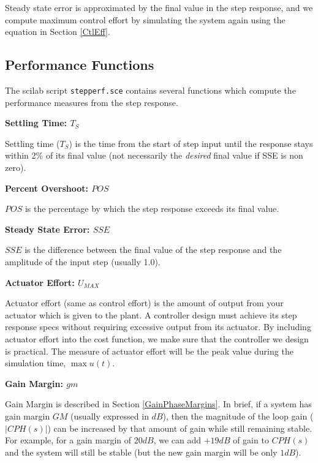 Steady state error is approximated by the final value in the step response, and we compute maximum control effort by simulating the system again using the equation in Section \ref{CtlEff}.	%






\subsection{Performance Functions}

The scilab script {\tt stepperf.sce} contains several functions which compute the performance measures from the step response.


{\bf Settling Time: $T_S$}

Settling time ($T_S$) is the time from the start of step input until the response stays within 2\% of its final value
(not necessarily the {\it desired} final value if SSE is non zero).	%

{\bf Percent Overshoot: $POS$}

$POS$ is the percentage by which the step response exceeds its final value.


{\bf Steady State Error: $SSE$}

$SSE$ is the difference between the final value of the step response and the amplitude of the input step (usually 1.0).

{\bf Actuator Effort: $U_{MAX}$}

Actuator effort (same as control effort) is the amount of output from your actuator which is given to the plant.  A controller design must achieve its step response specs without requiring excessive output from its actuator.   By including actuator effort into the cost function, we make sure that the controller we design is practical.   The measure of actuator effort will be the peak value during the simulation time, $\max{u(t)}$.	%


{\bf Gain Margin: $gm$}

Gain Margin is described in Section \ref{GainPhaseMargins}.   In brief, if a system has gain margin $GM$ (usually expressed in $dB$), then the magnitude of the loop gain ($|CPH(s)|$) can be increased by that amount of gain while still remaining stable.  For example, for a gain margin of $20dB$, we can add $+19dB$ of gain to $CPH(s)$ and the system will still be stable (but the new gain margin will be only $1dB$).


